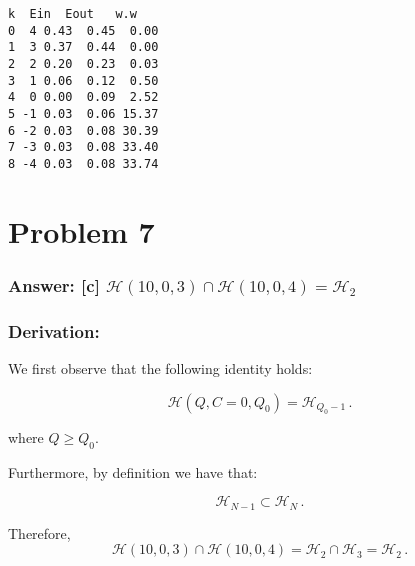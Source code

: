 \documentclass[11pt]{article}
\makeatletter
\newcommand{\boxspacing}{\kern\kvtcb@left@rule\kern\kvtcb@boxsep}
\newcommand{\prompt}[4]{
        \ttfamily\llap{{\color{#2}[#3]:\hspace{3pt}#4}}\vspace{-\baselineskip}
    }
\makeatother
\begin{document}
            \begin{tcolorbox}[breakable, size=fbox, boxrule=.5pt, pad at break*=1mm, opacityfill=0]
\prompt{Out}{outcolor}{165}{\boxspacing}
\begin{Verbatim}[commandchars=\\\{\}]
   k  Ein  Eout   w.w
0  4 0.43  0.45  0.00
1  3 0.37  0.44  0.00
2  2 0.20  0.23  0.03
3  1 0.06  0.12  0.50
4  0 0.00  0.09  2.52
5 -1 0.03  0.06 15.37
6 -2 0.03  0.08 30.39
7 -3 0.03  0.08 33.40
8 -4 0.03  0.08 33.74
\end{Verbatim}
\end{tcolorbox}
        
    \hypertarget{problem-7}{%
\section{Problem 7}\label{problem-7}}

\hypertarget{answer-c-mathcalh1003cap-mathcalh1004mathcalh_2}{%
\subsubsection{\texorpdfstring{Answer: {[}c{]}
\(\mathcal{H}(10,0,3)\cap \mathcal{H}(10,0,4)=\mathcal{H}_2\)}{Answer: {[}c{]} \textbackslash{}mathcal\{H\}(10,0,3)\textbackslash{}cap \textbackslash{}mathcal\{H\}(10,0,4)=\textbackslash{}mathcal\{H\}\_2}}\label{answer-c-mathcalh1003cap-mathcalh1004mathcalh_2}}

\hypertarget{derivation}{%
\subsubsection{Derivation:}\label{derivation}}

We first observe that the following identity holds:

\begin{equation}
\mathcal{H}(Q,C=0,Q_0)=\mathcal{H}_{Q_0-1}\,.
\end{equation}

where \(Q \ge Q_0\).

Furthermore, by definition we have that:

\begin{equation}
\mathcal{H}_{N-1}\subset\mathcal{H}_{N}\,.
\end{equation}

Therefore, \begin{equation}
\mathcal{H}(10,0,3)\cap \mathcal{H}(10,0,4)=\mathcal{H}_2\cap \mathcal{H}_3=\mathcal{H}_2\,.
\end{equation}
\end{document}
